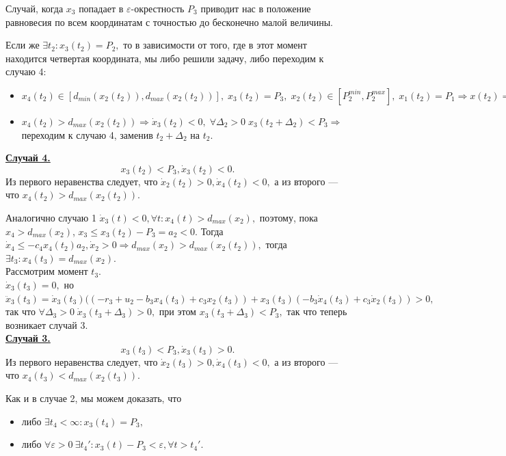 \documentclass[11pt]{article}
\begin{document}
Случай, когда $x_3$ попадает в $\varepsilon$-окрестность $P_3$ приводит нас в положение равновесия по всем координатам с точностью до бесконечно малой величины.

Если же $\exists t_2 : x_3(t_2) = P_2,$ то в зависимости от того, где в этот момент находится четвертая координата, мы либо решили задачу, либо переходим к случаю 4:
\begin{itemize}
	\item $x_4(t_2) \in [d_{min}(x_2(t_2)), d_{max}(x_2(t_2))], \; x_3(t_2) = P_3, \; x_2(t_2) \in [P_2^{min}, P_2^{max}], \; x_1(t_2) = P_1 \Rightarrow x(t_2) = P(u).$
	\item $x_4(t_2) > d_{max}(x_2(t_2)) \Rightarrow \dot x_3(t_2) < 0, \; \forall \Delta_2 > 0 \; x_3(t_2 + \Delta_2) < P_3 \Rightarrow$ переходим к случаю 4, заменив $t_2 + \Delta_2$ на $t_2$.
\end{itemize}

\underline{\bf Случай 4.}
$$x_3(t_2) < P_3, \dot x_3(t_2) < 0.$$
Из первого неравенства следует, что $\dot x_2(t_2) > 0, \dot x_4(t_2) < 0,$ а из второго --- что $x_4(t_2) > d_{max}(x_2(t_2)).$

Аналогично случаю 1 $\dot x_3(t) < 0, \forall t : x_4(t) > d_{max}(x_2),$ поэтому, пока $x_4 > d_{max}(x_2)$, $ x_3 \leqslant x_3(t_2) - P_3 = a_2 < 0.$ Тогда $\dot x_4 \leqslant -c_4x_4(t_2)a_2, \dot x_2 > 0 \Rightarrow d_{max}(x_2) > d_{max}(x_2(t_2)),$ тогда $\exists t_3 : x_4(t_3) = d_{max}(x_2).$ \\
Рассмотрим момент $t_3.$ \\
$\dot x_3(t_3) = 0,$ но $\ddot x_3(t_3) = \dot x_3(t_3)((-r_3 + u_2 - b_3x_4(t_3) + c_3x_2(t_3)) + x_3(t_3)(-b_3\dot x_4(t_3) + c_3 \dot x_2(t_3)) > 0,$ так что $\forall \Delta_3 > 0 \; \dot x_3(t_3 + \Delta_3) > 0,$ при этом $x_3(t_3 + \Delta_3) < P_3,$ так что теперь возникает случай 3.\\

\underline{\bf Случай 3.}
$$x_3(t_3) < P_3, \dot x_3(t_3) > 0.$$
Из первого неравенства следует, что $\dot x_2(t_3) > 0, \dot x_4(t_3) < 0,$ а из второго --- что $x_4(t_3) < d_{max}(x_2(t_3)).$

Как и в случае 2, мы можем доказать, что 
\begin{itemize}
	\item либо $\exists t_4 < \infty:  x_3(t_4) = P_3,$
	\item либо $\forall \varepsilon > 0 \: \exists t_4' : x_3(t) - P_3 < \varepsilon, \forall t > t_4'.$
\end{itemize}
\end{document}
